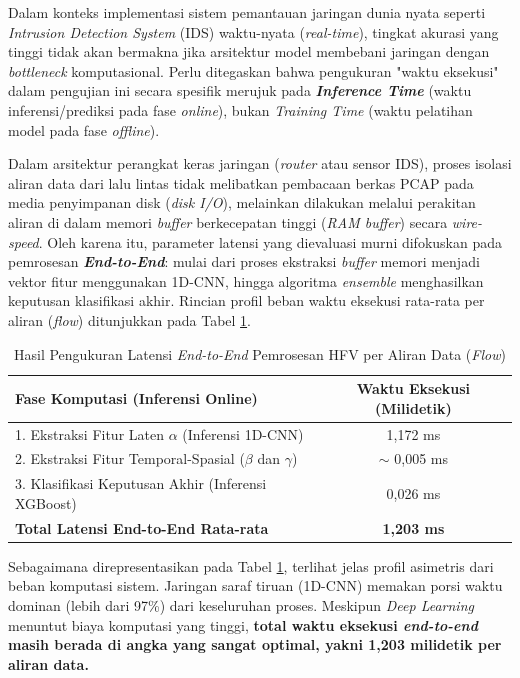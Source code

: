 Dalam konteks implementasi sistem pemantauan jaringan dunia nyata seperti \textit{Intrusion Detection System} (IDS) waktu-nyata (\textit{real-time}), tingkat akurasi yang tinggi tidak akan bermakna jika arsitektur model membebani jaringan dengan \textit{bottleneck} komputasional. Perlu ditegaskan bahwa pengukuran "waktu eksekusi" dalam pengujian ini secara spesifik merujuk pada \textbf{\textit{Inference Time}} (waktu inferensi/prediksi pada fase \textit{online}), bukan \textit{Training Time} (waktu pelatihan model pada fase \textit{offline}). 

Dalam arsitektur perangkat keras jaringan (\textit{router} atau sensor IDS), proses isolasi aliran data dari lalu lintas tidak melibatkan pembacaan berkas PCAP pada media penyimpanan disk (\textit{disk I/O}), melainkan dilakukan melalui perakitan aliran di dalam memori \textit{buffer} berkecepatan tinggi (\textit{RAM buffer}) secara \textit{wire-speed}. Oleh karena itu, parameter latensi yang dievaluasi murni difokuskan pada pemrosesan \textbf{\textit{End-to-End}}: mulai dari proses ekstraksi \textit{buffer} memori menjadi vektor fitur menggunakan 1D-CNN, hingga algoritma \textit{ensemble} menghasilkan keputusan klasifikasi akhir. Rincian profil beban waktu eksekusi rata-rata per aliran (\textit{flow}) ditunjukkan pada Tabel \ref{tab:end_to_end_latency}.

\begin{table}[h!]
\centering
\caption{Hasil Pengukuran Latensi \textit{End-to-End} Pemrosesan HFV per Aliran Data (\textit{Flow})}
\label{tab:end_to_end_latency}
\begin{tabular}{p{8cm} c}
\hline
\textbf{Fase Komputasi (Inferensi Online)} & \textbf{Waktu Eksekusi (Milidetik)} \\ \hline
1. Ekstraksi Fitur Laten $\alpha$ (Inferensi 1D-CNN) & 1,172 ms \\ 
2. Ekstraksi Fitur Temporal-Spasial ($\beta$ dan $\gamma$) & $\sim$ 0,005 ms \\ 
3. Klasifikasi Keputusan Akhir (Inferensi XGBoost) & 0,026 ms \\ \hline
\textbf{Total Latensi End-to-End Rata-rata} & \textbf{1,203 ms} \\ \hline
\end{tabular}
\end{table}

Sebagaimana direpresentasikan pada Tabel \ref{tab:end_to_end_latency}, terlihat jelas profil asimetris dari beban komputasi sistem. Jaringan saraf tiruan (1D-CNN) memakan porsi waktu dominan (lebih dari 97\%) dari keseluruhan proses. Meskipun \textit{Deep Learning} menuntut biaya komputasi yang tinggi, \textbf{total waktu eksekusi \textit{end-to-end} masih berada di angka yang sangat optimal, yakni 1,203 milidetik per aliran data.} 

